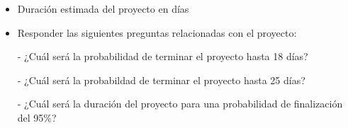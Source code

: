\documentclass[12pt]{article}
\begin{document}
\begin{itemize}
    \item Duración estimada del proyecto en días
    \item Responder las siguientes preguntas relacionadas con el proyecto:

    - ¿Cuál será la probabilidad de terminar el proyecto hasta 18 días?

    - ¿Cuál será la probabildad de terminar el proyecto hasta 25 días?

- ¿Cuál será la duración del proyecto para una probabilidad de finalización del
95\%?
    
\end{itemize}
\end{document}
